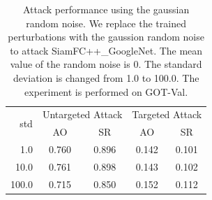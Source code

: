 \documentclass[12pt]{article}
\begin{document}

\begin{table}[t]
  \renewcommand\thetable{XII}
  \centering
  \caption{Attack performance using the gaussian random noise. We replace the trained perturbations with the gaussion random noise to attack SiamFC++\_GoogleNet. The mean value of the random noise is 0. The standard deviation is changed from 1.0 to 100.0. The experiment is performed on GOT-Val.}
  \begin{tabular}{@{}rcccc@{}}
  \toprule
  \multirow{2}{*}[-2pt]{std} & \multicolumn{2}{c}{Untargeted Attack} & \multicolumn{2}{c}{Targeted Attack} \\ \cmidrule{2-5}
                             & AO                & SR                & AO               & SR               \\ \midrule
  1.0                        & 0.760             & 0.896             & 0.142            & 0.101            \\
  10.0                       & 0.761             & 0.898             & 0.143            & 0.102            \\
  100.0                      & 0.715             & 0.850             & 0.152            & 0.112            \\ \bottomrule        
  \end{tabular}
  \label{table:noise}
\end{table}
\end{document}
